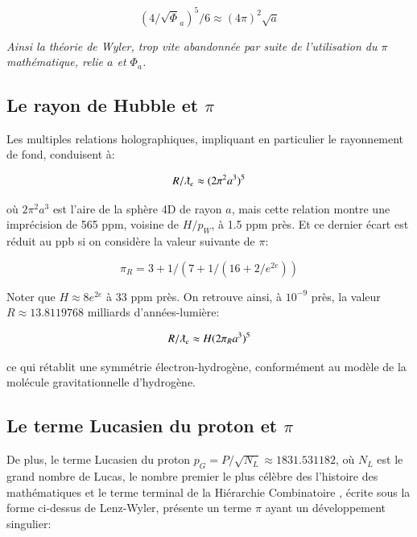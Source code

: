 \documentclass[a4paper,9pt]{article}
\begin{document}
\begin{equation}
(4/\sqrt \Phi_a)^5/6 \approx (4\pi)^2 \sqrt a
\end{equation}

\textit{Ainsi la théorie de Wyler, trop vite abandonnée par suite de l'utilisation du $\pi$ mathématique, relie $a$ et $\Phi_a$.}




\subsection{Le rayon de Hubble et $\pi$}
Les multiples relations holographiques, impliquant en particulier le rayonnement de fond, conduisent à:

\begin{equation}
R/\lambdabar_e \approx (2\pi^2a^3)^5
 \end{equation}

où $2\pi^2a^3$ est l’aire de la sphère 4D de rayon $a$, mais cette relation montre une imprécision de 565 ppm, voisine de $H/p_W$, à 1.5 ppm près. Et ce dernier écart est réduit au ppb si on considère la valeur suivante de $\pi$:

\begin{equation}
\pi_R = 3 + 1/(7+1/(16+2/e^{2e}))
\end{equation}

Noter que $H \approx 8e^{2e}$ à 33 ppm près. On retrouve ainsi, à $10^{-9}$ près, la valeur $R \approx 13.8119768$ milliards d’années-lumière:

\begin{equation}
R/\lambdabar_e  \approx H (2\pi_R a^3)^5
\end{equation}

ce qui rétablit une symmétrie électron-hydrogène, conformément au modèle de la molécule gravitationnelle d’hydrogène.





\subsection{Le terme Lucasien du proton et $\pi$}
De plus, le terme Lucasien du proton $p_G = P/\sqrt {N_L}\approx 1831.531182$, où $N_L$ est le grand nombre de Lucas, le nombre premier le plus célèbre des l'histoire des mathématiques et le terme terminal de la Hiérarchie Combinatoire \cite{Bastin}, écrite sous la forme ci-dessus de Lenz-Wyler, présente un terme $\pi$ ayant un développement singulier: 
\end{document}
